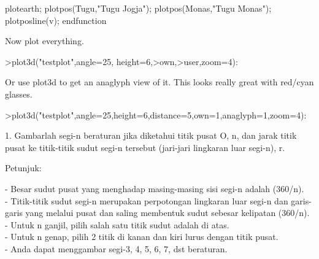 \documentclass{article}
\begin{document}
\begin{eulernotebook}
\begin{eulercomment}
\begin{eulercomment}
\begin{eulercomment}
\begin{eulercomment}
\begin{eulercomment}
\begin{eulercomment}
\begin{eulercomment}
\begin{eulercomment}
\begin{eulerudf}
  plotearth;
  plotpos(Tugu,"Tugu Jogja"); plotpos(Monas,"Tugu Monas");
  plotposline(v);
  endfunction
\end{eulerudf}
\begin{eulercomment}
Now plot everything.
\end{eulercomment}
\begin{eulerprompt}
>plot3d("testplot",angle=25, height=6,>own,>user,zoom=4):
\end{eulerprompt}
\begin{eulercomment}
Or use plot3d to get an anaglyph view of it. This looks really great
with red/cyan glasses.
\end{eulercomment}
\begin{eulerprompt}
>plot3d("testplot",angle=25,height=6,distance=5,own=1,anaglyph=1,zoom=4):
\end{eulerprompt}
\begin{eulercomment}
1. Gambarlah segi-n beraturan jika diketahui titik pusat O, n, dan
jarak titik pusat ke titik-titik sudut segi-n tersebut (jari-jari
lingkaran luar segi-n), r.

Petunjuk:

- Besar sudut pusat yang menghadap masing-masing sisi segi-n adalah
(360/n).\\
- Titik-titik sudut segi-n merupakan perpotongan lingkaran luar segi-n
dan garis-garis yang melalui pusat dan saling membentuk sudut sebesar
kelipatan (360/n).\\
- Untuk n ganjil, pilih salah satu titik sudut adalah di atas.\\
- Untuk n genap, pilih 2 titik di kanan dan kiri lurus dengan titik
pusat.\\
- Anda dapat menggambar segi-3, 4, 5, 6, 7, dst beraturan.


\end{eulercomment}
\end{eulercomment}
\end{eulercomment}
\end{eulercomment}
\end{eulercomment}
\end{eulercomment}
\end{eulercomment}
\end{eulercomment}
\end{eulercomment}
\end{eulernotebook}
\end{document}
